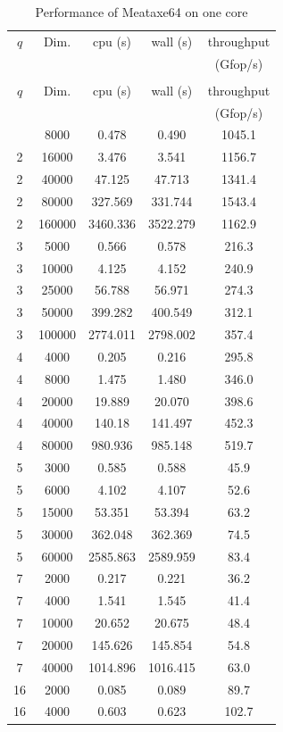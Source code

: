 \begin{small}
\begin{center}
  \begin{longtable}{|c|c|c|c|c|}
    \caption[]{Performance of Meataxe64 on one core}\label{fig:matmult:mtx64}\\
    \hline
    $q$&Dim.&cpu (s)&wall (s) &throughput\\
    &&&&(Gfop/s)\\
    \hline
    \endfirsthead
    \caption[]{Performance of Meataxe64 on one core}\\
    \hline
    $q$&Dim.&cpu (s)&wall (s) &throughput\\
    &&&&(Gfop/s)\\
    \hline
    \endhead
    \hline
    \endfoot
2&8000&0.478&0.490&1045.1\\
2&16000&3.476&3.541&1156.7\\
2&40000&47.125&47.713&1341.4\\
2&80000&327.569&331.744&1543.4\\
2&160000&3460.336&3522.279&1162.9\\
3&5000&0.566&0.578&216.3\\
3&10000&4.125&4.152&240.9\\
3&25000&56.788&56.971&274.3\\
3&50000&399.282&400.549&312.1\\
3&100000&2774.011&2798.002&357.4\\
4&4000&0.205&0.216&295.8\\
4&8000&1.475&1.480&346.0\\
4&20000&19.889&20.070&398.6\\
4&40000&140.18&141.497&452.3\\
4&80000&980.936&985.148&519.7\\
5&3000&0.585&0.588&45.9\\
5&6000&4.102&4.107&52.6\\
5&15000&53.351&53.394&63.2\\
5&30000&362.048&362.369&74.5\\
5&60000&2585.863&2589.959&83.4\\
7&2000&0.217&0.221&36.2\\
7&4000&1.541&1.545&41.4\\
7&10000&20.652&20.675&48.4\\
7&20000&145.626&145.854&54.8\\
7&40000&1014.896&1016.415&63.0\\
16&2000&0.085&0.089&89.7\\
16&4000&0.603&0.623&102.7\\

\end{longtable}
\end{center}
\end{small}
